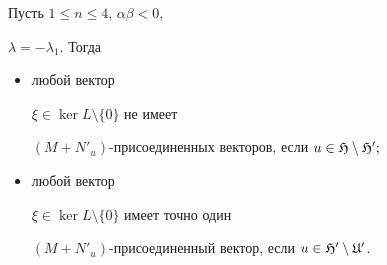 \begin{thms}


Пусть $1\leq n\leq4$, $\alpha\beta<0$,


$\lambda=-\lambda_{1}$. Тогда


\begin{itemize}


\item[(i)] любой вектор


$\xi\in\ker L\setminus\{0\}$ не имеет


$(M+N'_{u})$-присоединенных векторов, если $u\in\frak H\setminus\frak H';$


\item[(ii)] любой вектор


$\xi\in\ker L\setminus\{0\}$ имеет точно один


$(M+N'_{u})$-присоединенный вектор, если $u\in\frak H'\setminus\frak U'$.


\end{itemize}


\end{thms}








